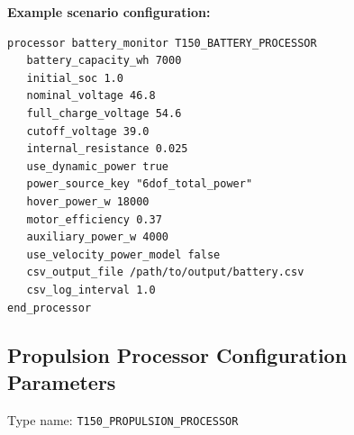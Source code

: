 \unclass \textbf{Example scenario configuration:}

\begin{codebox}
\begin{lstlisting}[language={},mathescape=false]
processor battery_monitor T150_BATTERY_PROCESSOR
   battery_capacity_wh 7000
   initial_soc 1.0
   nominal_voltage 46.8
   full_charge_voltage 54.6
   cutoff_voltage 39.0
   internal_resistance 0.025
   use_dynamic_power true
   power_source_key "6dof_total_power"
   hover_power_w 18000
   motor_efficiency 0.37
   auxiliary_power_w 4000
   use_velocity_power_model false
   csv_output_file /path/to/output/battery.csv
   csv_log_interval 1.0
end_processor
\end{lstlisting}
\end{codebox}

\subsection{\unclass Propulsion Processor Configuration Parameters}

\unclass Type name: \texttt{T150\_PROPULSION\_PROCESSOR}

